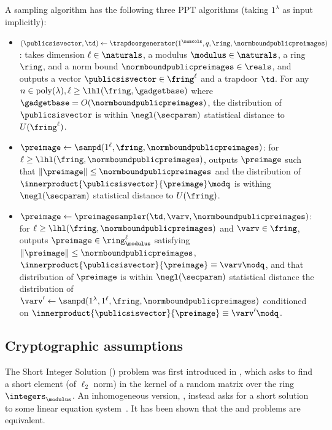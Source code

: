 A sampling algorithm has the following three PPT algorithms (taking $1^\lambda$ as input implicitly):

\begin{itemize}
    \item $(\publicsisvector, \td) \gets \trapdoorgenerator(1^\numcols, q, \ring, \normboundpublicpreimages)$: takes dimension $\ell \in \naturals$, a modulus $\modulus \in \naturals$, a ring $\ring$, and a norm bound $\normboundpublicpreimages \in \reals$, and outputs a vector $\publicsisvector \in \fring^\ell$ and a trapdoor $\td$. For any $n \in \poly(\lambda), \ell \geq \lhl(\fring, \gadgetbase)$ where $\gadgetbase = O(\normboundpublicpreimages)$, the distribution of $\publicsisvector$ is within $\negl(\secparam)$ statistical distance to $U(\fring^\ell)$. 
    \item $\preimage \gets \sampd(1^\ell, \fring, \normboundpublicpreimages)$: for $\ell \geq \lhl(\fring,\normboundpublicpreimages)$, outputs $\preimage$ such that $\norm{\preimage} \leq \normboundpublicpreimages$ and the distribution of $\innerproduct{\publicsisvector}{\preimage} \modq$ is withing $\negl(\secparam)$ statistical distance to $U(\fring)$.
    \item $\preimage \gets \preimagesampler(\td, \varv, \normboundpublicpreimages)$: for $\ell \geq \lhl(\fring,\normboundpublicpreimages)$ and $\varv \in \fring$, outputs $\preimage \in \ring^\ell_\modulus$ satisfying $\norm{\preimage} \leq \normboundpublicpreimages$, $\innerproduct{\publicsisvector}{\preimage} \equiv \varv \modq$, and that distribution of $\preimage$ is within $\negl(\secparam)$ statistical distance the distribution of $\varv' \gets \sampd(1^\lambda, 1^\ell, \fring, \normboundpublicpreimages)$ conditioned on $\innerproduct{\publicsisvector}{\preimage} \equiv \varv' \modq$.
\end{itemize}


\subsection{Cryptographic assumptions}

The Short Integer Solution (\sis) problem was first introduced in \cite{Ajt96}, which asks to find a short element (of $\ell_2$ norm) in the kernel of a random matrix over the ring $\integers_\modulus$. An inhomogeneous version, \isis, instead asks for a short solution to some linear equation system~\cite{Mic07}. It has been shown that the \sis and \isis problems are equivalent.

